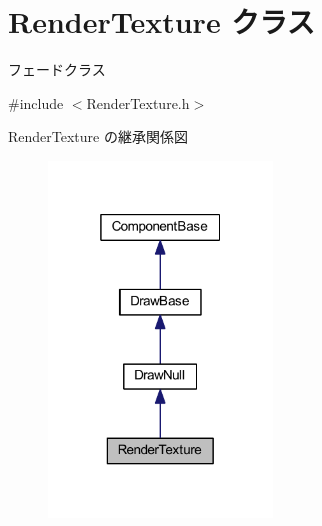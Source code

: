 \hypertarget{class_render_texture}{}\section{Render\+Texture クラス}
\label{class_render_texture}


フェードクラス  




{\ttfamily \#include $<$Render\+Texture.\+h$>$}



Render\+Texture の継承関係図\nopagebreak
\begin{figure}[H]
\begin{center}
\leavevmode
\includegraphics[width=169pt]{class_render_texture__inherit__graph}
\end{center}
\end{figure}
